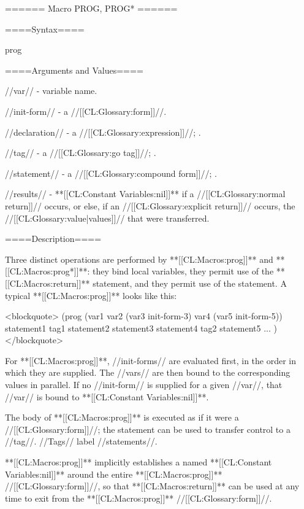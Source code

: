 ====== Macro PROG, PROG* ======

====Syntax====

\DefmacWithValuesNewline prog {  } {}

 {  } {}

====Arguments and Values====

//var// - variable name.

//init-form// - a //[[CL:Glossary:form]]//.

//declaration// - a  //[[CL:Glossary:expression]]//; \noeval.

//tag// - a //[[CL:Glossary:go tag]]//; \noeval.

//statement// - a //[[CL:Glossary:compound form]]//; \evalspecial.

//results// - **[[CL:Constant Variables:nil]]** if a //[[CL:Glossary:normal return]]// occurs, or else, if an //[[CL:Glossary:explicit return]]// occurs, the //[[CL:Glossary:value|values]]// that were transferred.

====Description====

Three distinct operations are performed by **[[CL:Macros:prog]]** and **[[CL:Macros:prog*]]**: they bind local variables, they permit use of the **[[CL:Macros:return]]** statement, and they permit use of the  statement. A typical **[[CL:Macros:prog]]** looks like this:

<blockquote> (prog (var1 var2 (var3 init-form-3) var4 (var5 init-form-5))  statement1 tag1 statement2 statement3 statement4 tag2 statement5 ... ) </blockquote>

For **[[CL:Macros:prog]]**, //init-forms// are evaluated first, in the order in which they are supplied. The //vars// are then bound to the corresponding values in parallel. If no //init-form// is supplied for a given //var//, that //var// is bound to **[[CL:Constant Variables:nil]]**.

The body of **[[CL:Macros:prog]]** is executed as if it were a  //[[CL:Glossary:form]]//; the  statement can be used to transfer control to a //tag//. //Tags// label //statements//.

**[[CL:Macros:prog]]** implicitly establishes a  named **[[CL:Constant Variables:nil]]** around the entire **[[CL:Macros:prog]]** //[[CL:Glossary:form]]//, so that **[[CL:Macros:return]]** can be used at any time to exit from the **[[CL:Macros:prog]]** //[[CL:Glossary:form]]//.

